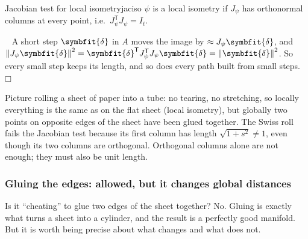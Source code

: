 \documentclass[11pt]{article}
\newcommand{\bm}[1]{\symbfit{#1}}
\newenvironment{proofsketch}{\par\noindent{\itshape Proof.}\ }{\hfill$\mdlgwhtsquare$\par}
\newcommand{\T}{^{\mathsf T}}
\newcommand{\norm}[1]{\left\lVert #1\right\rVert}
\begin{document}
\begin{proposition}{Jacobian test for local isometry}{jaciso}
$\psi$ is a local isometry if $J_\psi$ has orthonormal columns at every point, i.e.\ $J_\psi\T J_\psi=I_t$.
\end{proposition}
\begin{proofsketch}
A short step $\bm\delta$ in $A$ moves the image by $\approx J_\psi\bm\delta$, and $\norm{J_\psi\bm\delta}^2=\bm\delta\T J_\psi\T J_\psi\bm\delta=\norm{\bm\delta}^2$. So every small
step keeps its length, and so does every path built from small steps.
\end{proofsketch}

\begin{intuition}
Picture rolling a sheet of paper into a tube: no tearing, no stretching, so locally everything is the same as on the flat
sheet (local isometry), but globally two points on opposite edges of the sheet have been glued together. The Swiss
roll fails the Jacobian test because its first column has length $\sqrt{1+s^2}\ne1$, even though its two columns are
orthogonal. Orthogonal columns alone are not enough; they must also be unit length.
\end{intuition}

\subsubsection*{Gluing the edges: allowed, but it changes global distances}

Is it ``cheating'' to glue two edges of the sheet together? No. Gluing is exactly what turns a sheet into a cylinder, and the
result is a perfectly good manifold. But it is worth being precise about what changes and what does not.
\end{document}
